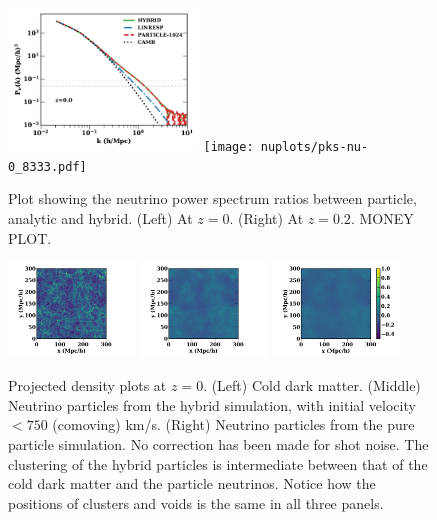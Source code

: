 \documentclass[useAMS, usenatbib]{mnras}
\begin{document}
\begin{figure}
\includegraphics[width=0.45\textwidth]{nuplots/pks-nu-1.pdf}
\texttt{[image: nuplots/pks-nu-0\_8333.pdf]}
  \caption{Plot showing the neutrino power spectrum ratios between particle, analytic and hybrid.
  (Left) At $z=0$. (Right) At $z=0.2$.
  MONEY PLOT.}
  \label{fig:neutrino_power}
\end{figure}

\begin{figure}
\includegraphics[width=0.3\textwidth]{nuplots/dens-plt-b300p512nu0_4hybt1.pdf}
\includegraphics[width=0.3\textwidth]{nuplots/dens-plt-b300p512nu0_4hybt2.pdf}
\includegraphics[width=0.3\textwidth]{nuplots/dens-plt-b300p512nu0_4pt2.pdf}
  \caption{Projected density plots at $z=0$. (Left) Cold dark matter. (Middle) Neutrino particles from the hybrid simulation, with initial velocity $<750$ (comoving) km/s. (Right) Neutrino particles from the pure particle simulation. No correction has been made for shot noise. The clustering of the hybrid particles is intermediate between that of the cold dark matter and the particle neutrinos. Notice how the positions of clusters and voids is the same in all three panels.}
  \label{fig:density_plot}
\end{figure}
\end{document}
